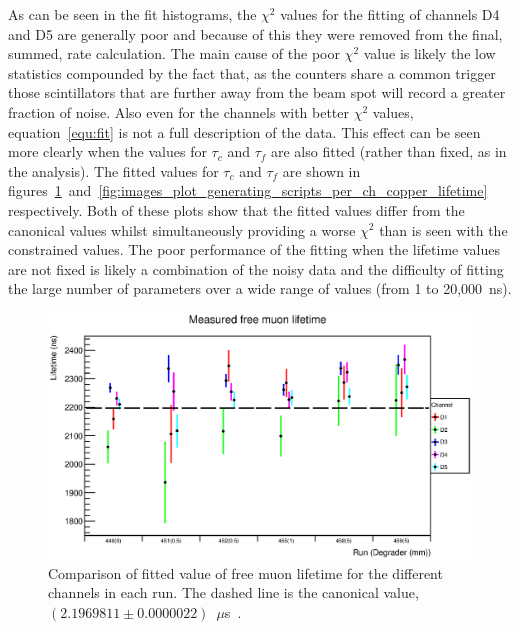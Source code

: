 
As can be seen in the fit histograms, the \(\chi^2\) values for the fitting of channels D4 and D5 are generally poor and because of this they were removed from the final, summed, rate calculation. The main cause of the poor \(\chi^2\) value is likely the low statistics compounded by the fact that, as the counters share a common trigger those scintillators that are further away from the beam spot will record a greater fraction of noise. Also even for the channels with better \(\chi^2\) values, equation~\eqref{equ:fit} is not a full description of the data. This effect can be seen more clearly when the values for \( \tau_c \) and \( \tau_f \) are also fitted (rather than fixed, as in the analysis). The fitted values for \(\tau_c\) and \(\tau_f\)  are shown in figures~\ref{fig:images_plot_generating_scripts_per_ch_free_lifetime}~and~\ref{fig:images_plot_generating_scripts_per_ch_copper_lifetime} respectively. Both of these plots show that the fitted values differ from the canonical values whilst simultaneously providing a worse \(\chi^2\) than is seen with the constrained values. The poor performance of the fitting when the lifetime values are not fixed is likely a combination of the noisy data and the difficulty of fitting the large number of parameters over a wide range of values (from 1 to 20,000~ns).

\begin{figure}[hptb]
  \centering
    \includegraphics[width=.9\textwidth]{images/plot_generating_scripts/per_ch_free_lifetime.eps}
  \caption{Comparison of fitted value of free muon lifetime for the different channels in each run. The dashed line is the canonical value, \((2.1969811\pm0.0000022)\)~\(\mu\)s~\cite{pdg}.}
  \label{fig:images_plot_generating_scripts_per_ch_free_lifetime}
\end{figure}

